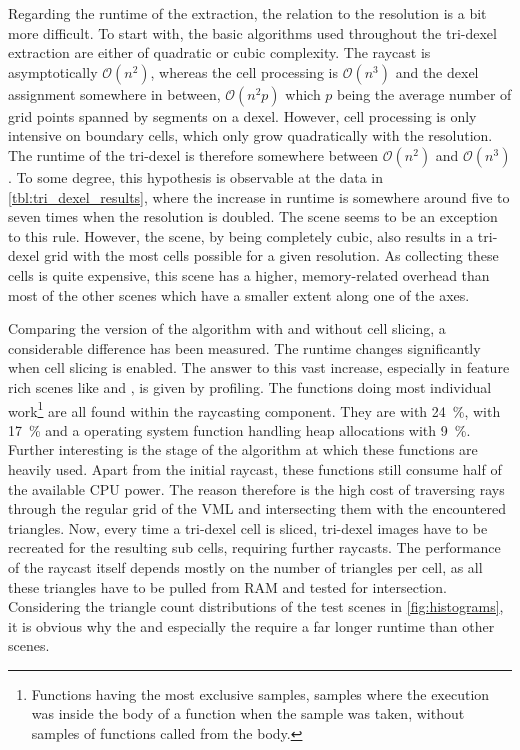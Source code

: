 Regarding the runtime of the extraction, the relation to the resolution is a bit more difficult.
To start with, the basic algorithms used throughout the tri-dexel extraction are either of quadratic or cubic complexity.
The raycast is asymptotically $\mathcal{O}(n^2)$, whereas the cell processing is $\mathcal{O}(n^3)$ and the dexel assignment somewhere in between, $\mathcal{O}(n^2p)$ which $p$ being the average number of grid points spanned by segments on a dexel.
However, cell processing is only intensive on boundary cells, which only grow quadratically with the resolution.
The runtime of the tri-dexel is therefore somewhere between $\mathcal{O}(n^2)$ and $\mathcal{O}(n^3)$.
To some degree, this hypothesis is observable at the data in \cref{tbl:tri_dexel_results}, where the increase in runtime is somewhere around five to seven times when the resolution is doubled.
The \cubes scene seems to be an exception to this rule.
However, the \cubes scene, by being completely cubic, also results in a tri-dexel grid with the most cells possible for a given resolution.
As collecting these cells is quite expensive, this scene has a higher, memory-related overhead than most of the other scenes which have a smaller extent along one of the axes.

Comparing the version of the algorithm with and without cell slicing, a considerable difference has been measured.
The runtime changes significantly when cell slicing is enabled.
The answer to this vast increase, especially in feature rich scenes like \impeller and \turbine, is given by profiling.
The functions doing most individual work\footnote{
	Functions having the most exclusive samples, \ie samples where the execution was inside the body of a function when the sample was taken, without samples of functions called from the body.}
are all found within the raycasting component.
They are  with \SI{24}{\percent},  with \SI{17}{\percent} and a operating system function handling heap allocations with \SI{9}{\percent}.
Further interesting is the stage of the algorithm at which these functions are heavily used.
Apart from the initial raycast, these functions still consume half of the available CPU power.
The reason therefore is the high cost of traversing rays through the regular grid of the VML and intersecting them with the encountered triangles.
Now, every time a tri-dexel cell is sliced, tri-dexel images have to be recreated for the resulting sub cells, requiring further raycasts.
The performance of the raycast itself depends mostly on the number of triangles per cell, as all these triangles have to be pulled from RAM and tested for intersection.
Considering the triangle count distributions of the test scenes in \cref{fig:histograms}, it is obvious why the \impeller and especially the \turbine require a far longer runtime than other scenes. %


